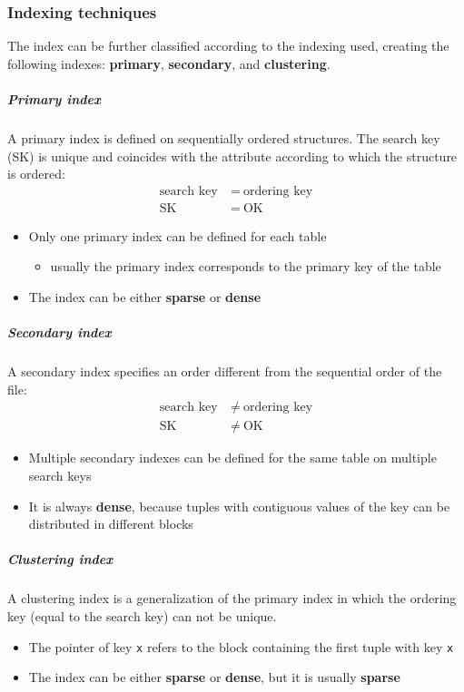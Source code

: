 \documentclass[english]{article}
\begin{document}
\subsubsection{Indexing techniques}

The index can be further classified according to the indexing used, creating the following indexes: \textbf{primary}, \textbf{secondary}, and \textbf{clustering}.

\subparagraph*{Primary index}
A primary index is defined on sequentially ordered structures.
The search key (SK) is unique and coincides with the attribute according to which the structure is ordered:
\begin{align*}
  \text{search key} \  & = \ \text{ordering key} \\
  \text{SK} \          & = \ \text{OK}
\end{align*}

\begin{itemize}
  \item Only one primary index can be defined for each table
        \begin{itemize}
          \item usually the primary index corresponds to the primary key of the table
        \end{itemize}
  \item The index can be either \textbf{sparse} or \textbf{dense}
\end{itemize}

\subparagraph*{Secondary index}
A secondary index specifies an order different from the sequential order of the file:
\begin{align*}
  \text{search key} \  & \neq \ \text{ordering key} \\
  \text{SK} \          & \neq \ \text{OK}
\end{align*}

\begin{itemize}
  \item Multiple secondary indexes can be defined for the same table on multiple search keys
  \item It is always \textbf{dense}, because tuples with contiguous values of the key can be distributed in different blocks
\end{itemize}

\subparagraph*{Clustering index}
A clustering index is a generalization of the primary index in which the ordering key (equal to the search key) can not be unique.

\begin{itemize}
  \item The pointer of key \texttt{x} refers to the block containing the first tuple with key \texttt{x}
  \item The index can be either \textbf{sparse} or \textbf{dense}, but it is usually \textbf{sparse}
\end{itemize}
\end{document}
